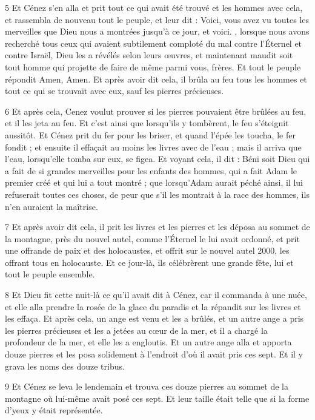 \par 5 Et Cénez s'en alla et prit tout ce qui avait été trouvé et les hommes avec cela, et rassembla de nouveau tout le peuple, et leur dit : Voici, vous avez vu toutes les merveilles que Dieu nous a montrées jusqu'à ce jour, et voici. , lorsque nous avons recherché tous ceux qui avaient subtilement comploté du mal contre l'Éternel et contre Israël, Dieu les a révélés selon leurs œuvres, et maintenant maudit soit tout homme qui projette de faire de même parmi vous, frères. Et tout le peuple répondit Amen, Amen. Et après avoir dit cela, il brûla au feu tous les hommes et tout ce qui se trouvait avec eux, sauf les pierres précieuses.

\par 6 Et après cela, Cenez voulut prouver si les pierres pouvaient être brûlées au feu, et il les jeta au feu. Et c'est ainsi que lorsqu'ils y tombèrent, le feu s'éteignit aussitôt. Et Cénez prit du fer pour les briser, et quand l'épée les toucha, le fer fondit ; et ensuite il effaçait au moins les livres avec de l'eau ; mais il arriva que l'eau, lorsqu'elle tomba sur eux, se figea. Et voyant cela, il dit : Béni soit Dieu qui a fait de si grandes merveilles pour les enfants des hommes, qui a fait Adam le premier créé et qui lui a tout montré ; que lorsqu'Adam aurait péché ainsi, il lui refuserait toutes ces choses, de peur que s'il les montrait à la race des hommes, ils n'en auraient la maîtrise.

\par 7 Et après avoir dit cela, il prit les livres et les pierres et les déposa au sommet de la montagne, près du nouvel autel, comme l'Éternel le lui avait ordonné, et prit une offrande de paix et des holocaustes, et offrit sur le nouvel autel 2000, les offrant tous en holocauste. Et ce jour-là, ils célébrèrent une grande fête, lui et tout le peuple ensemble.

\par 8 Et Dieu fit cette nuit-là ce qu'il avait dit à Cénez, car il commanda à une nuée, et elle alla prendre la rosée de la glace du paradis et la répandit sur les livres et les effaça. Et après cela, un ange est venu et les a brûlés, et un autre ange a pris les pierres précieuses et les a jetées au cœur de la mer, et il a chargé la profondeur de la mer, et elle les a engloutis. Et un autre ange alla et apporta douze pierres et les posa solidement à l'endroit d'où il avait pris ces sept. Et il y grava les noms des douze tribus.

\par 9 Et Cénez se leva le lendemain et trouva ces douze pierres au sommet de la montagne où lui-même avait posé ces sept. Et leur taille était telle que si la forme d'yeux y était représentée.

